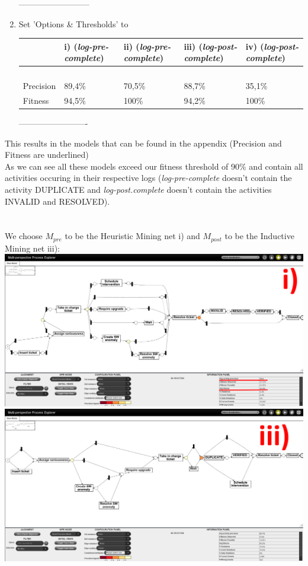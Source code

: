\documentclass[../../main.tex]{subfiles}
\begin{document}
\begin{enumerate}
\item [--------------------------]
\item Set 'Options \& Thresholds' to\\
\begin{table}[h!]
\begin{tabular}{l|llll}
           & i) (\textit{log-pre-complete}) & ii) (\textit{log-pre-complete}) & iii) (\textit{log-post-complete}) & iv) (\textit{log-post-complete})\\
           \hline
 &  &  &   &  \\
 &  &  &   &  \\
 &  &  &   &  \\
 &  &  &   &  \\
\hline
Precision & 89,4\% & 70,5\% & 88,7\% & 35,1\% \\
Fitness   & 94,5\% & 100\%  & 94,2\% & 100\%  \\
\end{tabular}
\end{table}
\item [-------------------------]
\end{enumerate}
This results in the models that can be found in the appendix (Precision and Fitness are underlined)\\
As we can see all these models exceed our fitness threshold of 90\% and contain all activities occuring in their respective logs (\textit{log-pre-complete} doesn't contain the activity DUPLICATE and \textit{log-post.complete} doesn't contain the activities INVALID and RESOLVED).\\
\\ \ \\
We choose $M_{pre}$ to be the Heuristic Mining net i) and $M_{post}$ to be the Inductive Mining net iii):\\
\includegraphics[width=0.5\columnwidth]{Question_2/img/ProM_b_PRE_i.png}
\includegraphics[width=0.5\columnwidth]{Question_2/img/ProM_b_inductive_POST_iii.png}\\
\end{document}
